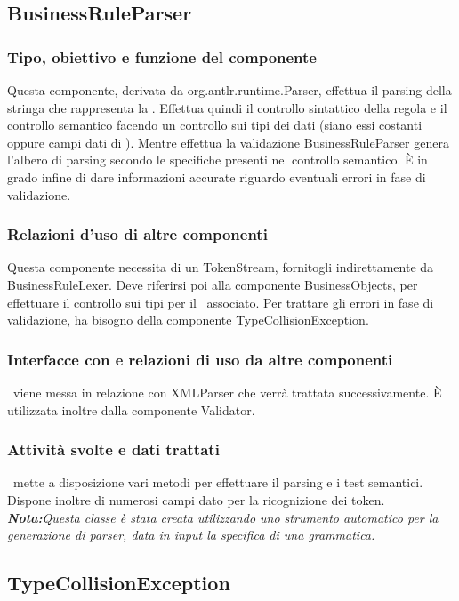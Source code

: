 \documentclass[11pt,titlepage,a4paper]{report}
\begin{document}
\subsection{BusinessRuleParser}
\subsubsection{Tipo, obiettivo e funzione del componente}
Questa componente, derivata da org.antlr.runtime.Parser, effettua il parsing della stringa che rappresenta la \br. Effettua quindi il controllo sintattico della regola e il controllo semantico facendo un controllo sui tipi dei dati (siano essi costanti oppure campi dati di \bos). Mentre effettua la validazione BusinessRuleParser genera l'albero di parsing secondo le specifiche presenti nel controllo semantico. \`E in grado infine di dare informazioni accurate riguardo eventuali errori in fase di validazione.
\subsubsection{Relazioni d'uso di altre componenti}
Questa componente necessita di un TokenStream, fornitogli indirettamente da BusinessRuleLexer. Deve riferirsi poi alla componente BusinessObjects, per effettuare il controllo sui tipi per il \bo\ associato. Per trattare gli errori in fase di validazione, ha bisogno della componente TypeCollisionException.
\subsubsection{Interfacce con e relazioni di uso da altre componenti}
\brp\ viene messa in relazione con XMLParser che verr\`a trattata successivamente.
\`E utilizzata inoltre dalla componente Validator.
\subsubsection{Attivit\`a svolte e dati trattati}
\brp\ mette a disposizione vari metodi per effettuare il parsing e i test semantici. Dispone inoltre di numerosi campi dato per la ricognizione dei token.\\
\textit{\textbf{Nota:}Questa classe \`e stata creata utilizzando uno strumento automatico per la generazione di parser, data in input la specifica di una grammatica.}

\subsection{TypeCollisionException}
\end{document}
